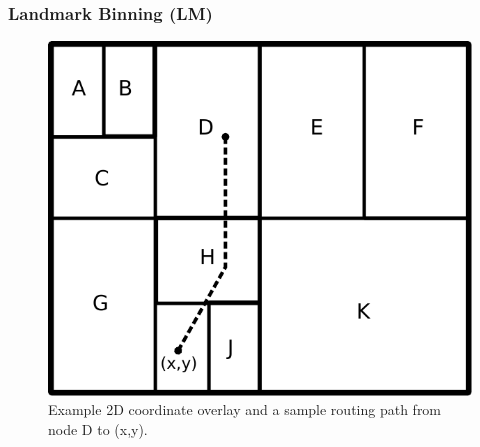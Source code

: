 \subsubsection{Landmark Binning (LM)}\label{sec:landmark_binning}
\begin{figure}
\centering
  \includegraphics[scale=0.4]{img/algorithms/landmark_binning}
\caption{Example 2D coordinate overlay and a sample routing path from node D to
(x,y).}
\label{fig:landmark_binning}
\end{figure}

